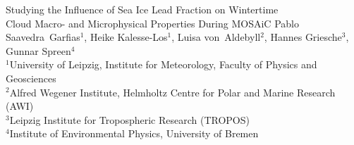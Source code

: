 \documentclass[portrate,a0paper,fontscale=0.45,margin=1cm]{baposter}
\begin{document}
\begin{poster}
{\begin{tabular}{l}
    \end{tabular}   
  }
  {
  	Studying the Influence of Sea Ice Lead Fraction on Wintertime\\Cloud Macro- and Microphysical Properties During MOSAiC
  }
  {\vspace{+1em} Pablo Saavedra~Garfias$^{1}$, Heike Kalesse-Los$^{1}$, Luisa von~Aldebyll$^{2}$, Hannes Griesche$^{3}$, Gunnar Spreen$^{4}$\\
    $^1$University of Leipzig, Institute for Meteorology, Faculty of Physics and Geosciences\\
    $^2$Alfred Wegener Institute, Helmholtz Centre for Polar and Marine Research (AWI)\\
    $^3$Leipzig Institute for Tropospheric Research (TROPOS)\\
    $^4$Institute of Environmental Physics, University of Bremen
   }
  {%
  }

    \newcommand{\colouredcircle}{%
      \vspace{1em}\tikz{\useasboundingbox (-0.2em,-0.32em) rectangle(0.2em,0.32em); \draw[draw=black,fill=lightblue,line width=0.03em] (0,0) circle(0.28em);}\hspace{0.8em}}


\end{poster}
\end{document}
